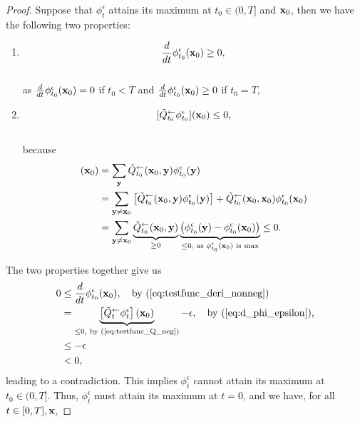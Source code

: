 \documentclass{article} %
\def\eqref#1{equation~\ref{#1}}
\newcommand{\bfx}{{\bf x}}
\newcommand{\bfy}{ {\bf y}}
\renewcommand{\eqref}[1]{\textup{(\ref{#1})}}
\begin{document}
\begin{proof}
        Suppose that $\phi^\epsilon_t$ attains its maximum at $t_0 \in (0, T]$ and $\bfx_0$, then we have the following two properties:
        \begin{enumerate}
            \item \begin{equation}\label{eq:testfunc_deri_nonneg}\frac{d  }{dt} \phi_{t_0}^\epsilon(\bfx_0) \geq 0,\end{equation} \\
            as $\frac{d  }{dt} \phi_{t_0}^\epsilon(\bfx_0)  = 0$ if $t_0 < T$ and $\frac{d  }{dt} \phi_{t_0}^\epsilon(\bfx_0)  \geq 0$ if $t_0 = T$,
            \item \begin{equation}\label{eq:testfunc_Q_neg}[\tilde{Q}_{t_0}^{\leftarrow} \phi_{t_0}^\epsilon](\bfx_0) \leq 0,\end{equation} \\
            because
            \begin{align*}
                [\tilde{Q}_{t_0}^{\leftarrow} \phi_{t_0}^\epsilon](\bfx_0) &= \sum_\bfy \tilde{Q}_{t_0}^{\leftarrow}(\bfx_0, \bfy) \phi_{t_0}^\epsilon(\bfy)\\
                &=\sum_{\bfy \neq \bfx_0} \left[\tilde{Q}_{t_0}^{\leftarrow}(\bfx_0, \bfy) \phi_{t_0}^\epsilon(\bfy) \right] + \tilde{Q}_{t_0}^{\leftarrow}(\bfx_0, \bfx_0) \phi_{t_0}^\epsilon(\bfx_0)\\
                &=\sum_{\bfy \neq \bfx_0} \underbrace{\tilde{Q}_{t_0}^{\leftarrow}(\bfx_0, \bfy)}_{\geq 0} \underbrace{\left(\phi_{t_0}^\epsilon(\bfy)-\phi_{t_0}^\epsilon(\bfx_0) \right)}_{\leq 0, \text{ as $\phi_{t_0}^\epsilon(\bfx_0)$ is max}} \leq 0.
            \end{align*}
        \end{enumerate}
    The two properties together give us
    \begin{align*}
        0 &\leq \frac{d  }{dt} \phi_{t_0}^\epsilon(\bfx_0) , \quad \text{by~\eqref{eq:testfunc_deri_nonneg}}\\
        &= \underbrace{\left[ \tilde{Q}_{t}^{\leftarrow}  \phi^\epsilon_t\right](\bfx_0)}_{\leq 0, \text{ by~\eqref{eq:testfunc_Q_neg}}}  - \epsilon ,\quad \text{by~\eqref{eq:d_phi_epsilon},}\\
        &\leq -\epsilon \\
        &<0,
    \end{align*}
    leading to a contradiction. This implies $\phi^\epsilon_t$ cannot attain its maximum at $t_0 \in (0, T]$. Thus, $\phi^\epsilon_t$ must attain its maximum at $t=0$, and we have, for all $t \in [0, T], \bfx$,

\end{proof}
\end{document}
